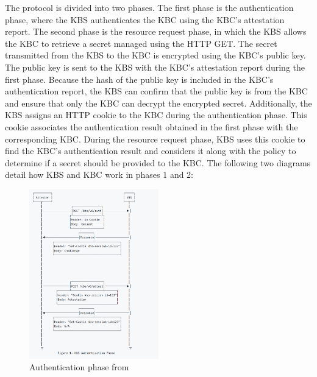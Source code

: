 The protocol is divided into two phases. The first phase is the authentication phase, where the \acrshort{KBS} authenticates the \acrshort{KBC} using the \acrshort{KBC}'s attestation report. The second phase is the resource request phase, in which the \acrshort{KBS} allows the \acrshort{KBC} to retrieve a secret managed using the HTTP GET.  
The secret transmitted from the \acrshort{KBS} to the \acrshort{KBC} is encrypted using the \acrshort{KBC}'s public key. The public key is sent to the \acrshort{KBS} with the \acrshort{KBC}'s attestation report during the first phase. Because the hash of the public key is included in the \acrshort{KBC}'s authentication report, the \acrshort{KBS} can confirm that the public key is from the \acrshort{KBC} and ensure that only the \acrshort{KBC} can decrypt the encrypted secret. Additionally, the \acrshort{KBS} assigns an HTTP cookie to the \acrshort{KBC} during the authentication phase. This cookie associates the authentication result obtained in the first phase with the corresponding \acrshort{KBC}. During the resource 
request phase, \acrshort{KBS} uses this cookie to find the \acrshort{KBC}'s authentication result and considers it along with the policy to determine if a secret should be provided to the \acrshort{KBC}. The following two diagrams detail how \acrshort{KBS} and \acrshort{KBC} work in phases 1 and 2:


\begin{figure}[htp]
    \centering
    \includegraphics[width=0.5\textwidth]{images/attestation.PNG}
    \caption[Authentication phase]{Authentication phase from~\cite*{kbs_Attestation_protocol}}
    \label{fig:Authentication}
\end{figure}

